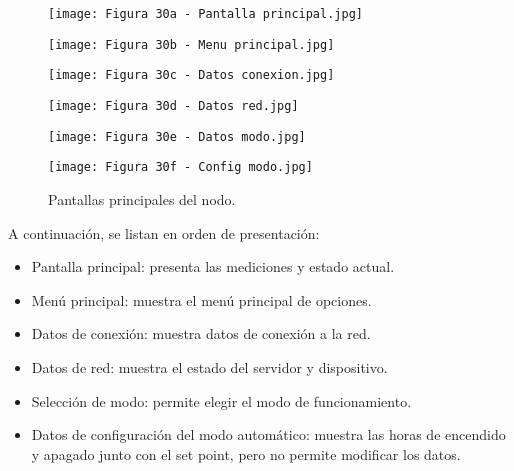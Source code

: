 \begin{figure}[h]
\centering
\begin{minipage}{0.32\textwidth}
  \centering
  \texttt{[image: Figura 30a - Pantalla principal.jpg]}
\end{minipage}%
\begin{minipage}{0.32\textwidth}
  \centering
  \texttt{[image: Figura 30b - Menu principal.jpg]}
\end{minipage}
\begin{minipage}{0.32\textwidth}
  \centering
  \texttt{[image: Figura 30c - Datos conexion.jpg]}
\end{minipage}
\end{figure}
\begin{figure}[h]
\centering
\begin{minipage}{0.32\textwidth}
  \centering
  \texttt{[image: Figura 30d - Datos red.jpg]}
\end{minipage}
\begin{minipage}{0.32\textwidth}
  \centering
  \texttt{[image: Figura 30e - Datos modo.jpg]}
\end{minipage}
\begin{minipage}{0.32\textwidth}
  \centering
  \texttt{[image: Figura 30f - Config modo.jpg]}
\end{minipage}
\caption[Pantallas principales del nodo]{Pantallas principales del nodo.}
\label{fig:30}
\end{figure}

A continuación, se listan en orden de presentación:

\begin{itemize}
	\item Pantalla principal: presenta las mediciones y estado actual.
	\item Menú principal: muestra el menú principal de opciones.
	\item Datos de conexión: muestra datos de conexión a la red.
	\item Datos de red: muestra el estado del servidor y dispositivo.
	\item Selección de modo: permite elegir el modo de funcionamiento.
	\item Datos de configuración del modo automático: muestra las horas de encendido y apagado junto con el set point, pero no permite modificar los datos.
\end{itemize}

